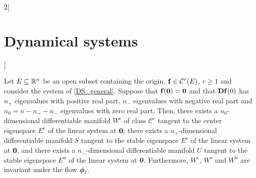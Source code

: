 \documentclass[../../../main_math.tex]{subfiles}
\begin{document}
\begin{multicols}{2}[\section{Dynamical systems}]
\begin{theorem}
    Let $E\subseteq\mathbb{R}^n$ be an open subset containing the origin, $\boldsymbol{\mathrm{f}}\in\mathcal{C}^r(E)$, $r\geq 1$ and consider the system of \cref{DS_general}. Suppose that $\boldsymbol{\mathrm{f}}(\boldsymbol{\mathrm{0}})=\boldsymbol{\mathrm{0}}$ and that $\boldsymbol{\mathrm{Df}}(0)$ has $n_+$ eigenvalues with positive real part, $n_-$ eigenvalues with negative real part and $n_0=n-n_+-n_-$ eigenvalues with zero real part. Then, there exists a $n_0$-dimensional differentiable manifold $W^\text{c}$ of class $\mathcal{C}^r$ tangent to the center eigenspace $E^\text{c}$ of the linear system at $\boldsymbol{\mathrm{0}}$; there exists a $n_+$-dimensional differentiable manifold $S$ tangent to the stable eigenspace $E^\text{s}$ of the linear system at $\boldsymbol{\mathrm{0}}$, and there exists a $n_-$-dimensional differentiable manifold $U$ tangent to the stable eigenspace $E^\text{u}$ of the linear system at $\boldsymbol{\mathrm{0}}$. Furthermore, $W^\text{c}$, $W^\text{s}$ and $W^\text{u}$ are invariant under the flow $\boldsymbol{\mathrm{\phi}}_t$.
  \end{theorem}

\end{multicols}
\end{document}
